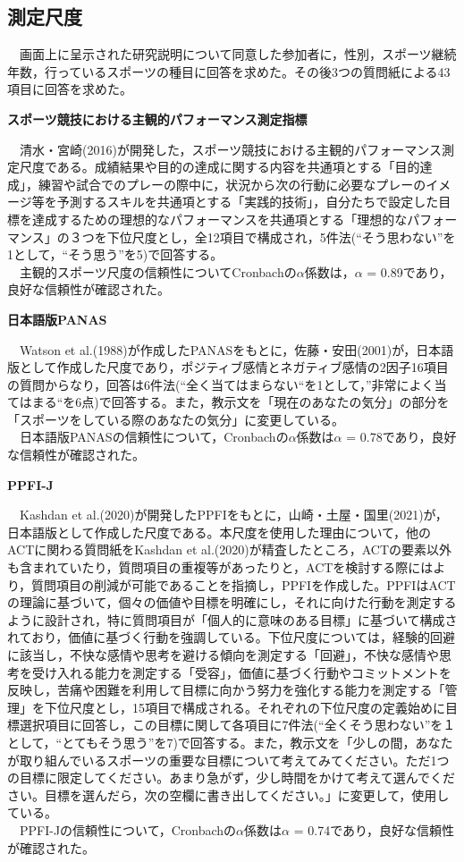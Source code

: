 \documentclass[12pt,a4paper,xelatex,ja=standard]{bxjsarticle}
\begin{document}
\clearpage

\hypertarget{ux6e2cux5b9aux5c3aux5ea6}{%
\subsection{測定尺度}\label{ux6e2cux5b9aux5c3aux5ea6}}

　画面上に呈示された研究説明について同意した参加者に，性別，スポーツ継続年数，行っているスポーツの種目に回答を求めた。その後3つの質問紙による43項目に回答を求めた。
　

\textbf{スポーツ競技における主観的パフォーマンス測定指標}

　清水・宮崎(2016)が開発した，スポーツ競技における主観的パフォーマンス測定尺度である。成績結果や目的の達成に関する内容を共通項とする「目的達成」，練習や試合でのプレーの際中に，状況から次の行動に必要なプレーのイメージ等を予測するスキルを共通項とする「実践的技術」，自分たちで設定した目標を達成するための理想的なパフォーマンスを共通項とする「理想的なパフォーマンス」の３つを下位尺度とし，全12項目で構成され，5件法(``そう思わない''を1として，``そう思う''を5)で回答する。\\
　主観的スポーツ尺度の信頼性についてCronbachの\(\alpha\)係数は，\(\alpha\)
= 0.89であり，良好な信頼性が確認された。

\textbf{日本語版PANAS}

　Watson et
al.(1988)が作成したPANASをもとに，佐藤・安田(2001)が，日本語版として作成した尺度であり，ポジティブ感情とネガティブ感情の2因子16項目の質問からなり，回答は6件法(``全く当てはまらない``を1として，''非常によく当てはまる``を6点)で回答する。また，教示文を「現在のあなたの気分」の部分を「スポーツをしている際のあなたの気分」に変更している。\\
　日本語版PANASの信頼性について，Cronbachの\(\alpha\)係数は\(\alpha\) =
0.78であり，良好な信頼性が確認された。

\textbf{PPFI-J}　

　Kashdan et
al.(2020)が開発したPPFIをもとに，山崎・土屋・国里(2021)が，日本語版として作成した尺度である。本尺度を使用した理由について，他のACTに関わる質問紙をKashdan
et
al.(2020)が精査したところ，ACTの要素以外も含まれていたり，質問項目の重複等があったりと，ACTを検討する際にはより，質問項目の削減が可能であることを指摘し，PPFIを作成した。PPFIはACTの理論に基づいて，個々の価値や目標を明確にし，それに向けた行動を測定するように設計され，特に質問項目が「個人的に意味のある目標」に基づいて構成されており，価値に基づく行動を強調している。下位尺度については，経験的回避に該当し，不快な感情や思考を避ける傾向を測定する「回避」，不快な感情や思考を受け入れる能力を測定する「受容」，価値に基づく行動やコミットメントを反映し，苦痛や困難を利用して目標に向かう努力を強化する能力を測定する「管理」を下位尺度とし，15項目で構成される。それぞれの下位尺度の定義始めに目標選択項目に回答し，この目標に関して各項目に7件法(``全くそう思わない''を１として，``とてもそう思う''を7)で回答する。また，教示文を「少しの間，あなたが取り組んでいるスポーツの重要な目標について考えてみてください。ただ1つの目標に限定してください。あまり急がず，少し時間をかけて考えて選んでください。目標を選んだら，次の空欄に書き出してください。」に変更して，使用している。\\
　PPFI-Jの信頼性について，Cronbachの\(\alpha\)係数は\(\alpha\) =
0.74であり，良好な信頼性が確認された。
\end{document}
